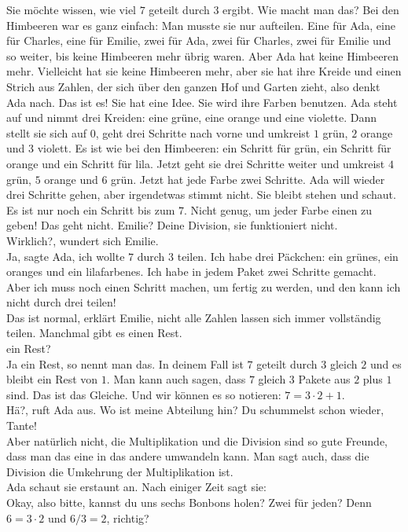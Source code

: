 Sie möchte wissen, wie viel $7$ geteilt durch $3$ ergibt. Wie macht man das? Bei den Himbeeren war es ganz einfach: Man musste sie nur aufteilen. Eine für Ada, eine für Charles, eine für Emilie, zwei für Ada, zwei für Charles, zwei für Emilie und so weiter, bis keine Himbeeren mehr übrig waren. 
Aber Ada hat keine Himbeeren mehr. Vielleicht hat sie keine Himbeeren mehr, aber sie hat ihre Kreide und einen Strich aus Zahlen, der sich über den ganzen Hof und Garten zieht, also denkt Ada nach. Das ist es! Sie hat eine Idee. Sie wird ihre Farben benutzen.
Ada steht auf und nimmt drei Kreiden: eine grüne, eine orange und eine violette. Dann stellt sie sich auf $0$, geht drei Schritte nach vorne und umkreist $1$ grün, $2$ orange und $3$ violett. Es ist wie bei den Himbeeren: ein Schritt für grün, ein Schritt für orange und ein Schritt für lila.
Jetzt geht sie drei Schritte weiter und umkreist $4$ grün, $5$ orange und $6$ grün. Jetzt hat jede Farbe zwei Schritte.
Ada will wieder drei Schritte gehen, aber irgendetwas stimmt nicht. Sie bleibt stehen und schaut. Es ist nur noch ein Schritt bis zum $7$. Nicht genug, um jeder Farbe einen zu geben! Das geht nicht.
\frqq{}Emilie? Deine Division, sie funktioniert nicht.\flqq{}\\
\frqq{}Wirklich?\flqq{}, wundert sich Emilie.\\
\frqq{}Ja\flqq{}, sagte Ada, \frqq{}ich wollte $7$ durch $3$ teilen. Ich habe drei Päckchen: ein grünes, ein oranges und ein lilafarbenes. Ich habe in jedem Paket zwei Schritte gemacht. Aber ich muss noch einen Schritt machen, um fertig zu werden, und den kann ich nicht durch drei teilen!\flqq{}\\
\frqq{}Das ist normal\flqq{}, erklärt Emilie, \frqq{}nicht alle Zahlen lassen sich immer vollständig teilen. Manchmal gibt es einen Rest.\flqq{}\\
\frqq{}ein Rest?\flqq{}\\
\frqq{}Ja ein Rest, so nennt man das. In deinem Fall ist $7$ geteilt durch $3$ gleich $2$ und es bleibt ein Rest von $1$. Man kann auch sagen, dass $7$ gleich $3$ Pakete aus $2$ plus $1$ sind. Das ist das Gleiche. Und wir können es so notieren: $7=3\cdot2+1$.\flqq{}\\
\frqq{}Hä?\flqq{}, ruft Ada aus. \frqq{}Wo ist meine Abteilung hin? Du schummelst schon wieder, Tante!\flqq{}\\
\frqq{}Aber natürlich nicht, die Multiplikation und die Division sind so gute Freunde, dass man das eine in das andere umwandeln kann. Man sagt auch, dass die Division die Umkehrung der Multiplikation ist.\flqq{}\\
Ada schaut sie erstaunt an. Nach einiger Zeit sagt sie:\\
\frqq{}Okay, also bitte, kannst du uns sechs Bonbons holen? Zwei für jeden? Denn $6 = 3 \cdot 2$ und $6 / 3 = 2$, richtig?\flqq{} 

